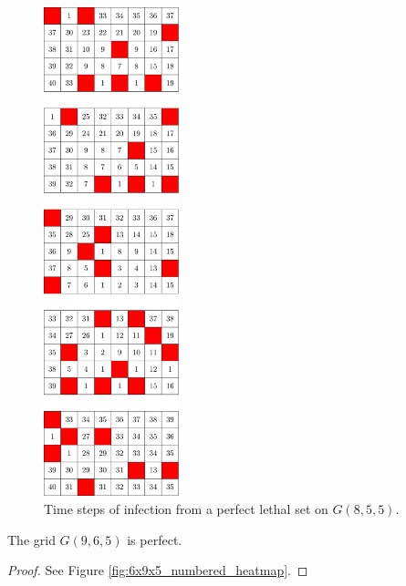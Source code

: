 \begin{figure}[H]
\centering
\includegraphics[width=0.35\textwidth]{figures/7/5x8x5_numbered_heatmap.pdf}
\caption{Time steps of infection from a perfect lethal set on $G(8,5,5)$.}
\label{fig:5x8x5_numbered_heatmap}
\end{figure}

\newpage

\begin{con}
\label{con:9x6x5}
The grid $G(9,6,5)$ is perfect.
\end{con}

\begin{proof}
See Figure \ref{fig:6x9x5_numbered_heatmap}.
\end{proof}

